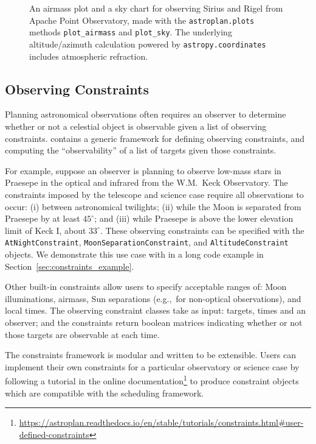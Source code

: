 \begin{figure}
\caption{An airmass plot and a sky chart for observing Sirius and Rigel from Apache Point Observatory, made with the \texttt{astroplan.plots} methods \texttt{plot\_airmass} and \texttt{plot\_sky}. The underlying altitude/azimuth calculation powered by \texttt{astropy.coordinates} includes atmospheric refraction.}
\label{fig:plots}
\end{figure}

\subsection{Observing Constraints} \label{sec:constraints}

Planning astronomical observations often requires an observer to determine whether or not a celestial object is observable given a list of observing constraints. \astroplan contains a generic framework for defining observing constraints, and computing the ``observability'' of a list of targets given those constraints.

For example, suppose an observer is planning to observe low-mass stars in Praesepe in the optical and infrared from the W.M.~Keck Observatory. The constraints imposed by the telescope and science case require all observations to occur: (i) between astronomical twilights; (ii) while the Moon is separated from Praesepe by at least $45^\circ$; and (iii) while Praesepe is above the lower elevation limit of Keck I, about $33^\circ$. These observing constraints can be specified with the \texttt{AtNightConstraint}, \texttt{MoonSeparationConstraint}, and \texttt{AltitudeConstraint} objects. We demonstrate this use case with \astroplan in a long code example in Section~\ref{sec:constraints_example}.

Other built-in constraints allow users to specify acceptable ranges of: Moon illuminations, airmass, Sun separations (e.g.,~for non-optical observations), and local times. The observing constraint classes take as input: targets, times and an observer; and the constraints return boolean matrices indicating whether or not those targets are observable at each time. 

The constraints framework is modular and written to be extensible. Users can implement their own constraints for a particular observatory or science case by following a tutorial in the online documentation\footnote{\url{https://astroplan.readthedocs.io/en/stable/tutorials/constraints.html\#user-defined-constraints}} to produce constraint objects which are compatible with the \astroplan scheduling framework.

